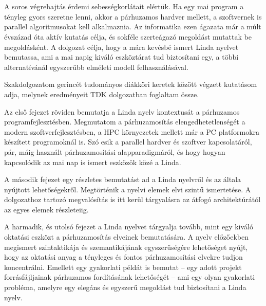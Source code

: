 \chapter{\bevezetes}

\sloppy

A soros végrehajtás érdemi sebességkorlátait elértük.
Ha egy mai program a tényleg gyors szeretne lenni, akkor a párhuzamos hardver mellett, a szoftvernek is parallel algoritmusokat kell alkalmaznia.
Az informatika ezen ágazata már a múlt évszázad óta aktív kutatás célja, és sokféle szerteágazó megoldást mutattak be megoldásként.
A dolgozat célja, hogy a mára kevésbé ismert Linda nyelvet bemutassa, ami a mai napig kiváló eszköztárat tud biztosítani egy, a többi alternatívánál egyszerűbb elméleti modell felhasználásával.

Szakdolgozatom gerincét tudományos diákköri keretek között végzett kutatásom adja, melynek eredményeit TDK dolgozatban foglaltam össze. \cite{bodor_linda_2024}

Az első fejezet röviden bemutatja a Linda nyelv kontextusát a párhuzamos programfejlesztésben.
Megmutatom a párhuzamosítás elengedhetetlenségét a modern szoftverfejlesztésben, a \ac{HPC} környezetek mellett már a PC platformokra készített programoknál is.
Szó esik a parallel hardver és szoftver kapcsolatáról, pár, máig használt párhuzamosítási alapparadigmáról, és hogy hogyan kapcsolódik az mai nap is ismert eszközök közé a Linda.

A második fejezet egy részletes bemutatást ad a Linda nyelvről és az általa nyújtott lehetőségekről.
Megtörténik a nyelvi elemek elvi szintű ismertetése.
A dolgozathoz tartozó megvalósítás is itt kerül tárgyalásra az átfogó architektúrától az egyes elemek részleteiig.

A harmadik, és utolsó fejezet a Linda nyelvet tárgyalja tovább, mint egy kiváló oktatási eszközt a párhuzamosítás elveinek bemutatására.
A nyelv előzőekben megismert szintaktikája és szemantikájának egyszerűségére lehetőséget nyújt, hogy az oktatási anyag a tényleges és fontos párhuzamosítási elvekre tudjon koncentrálni.
Emellett egy gyakorlati példát is bemutat -- egy adott projekt forrásfájljainak párhuzamos fordításának lehetőségét -- ami egy olyan gyakorlati probléma, amelyre egy elegáns és egyszerű megoldást tud biztosítani a Linda nyelv.

\fussy
